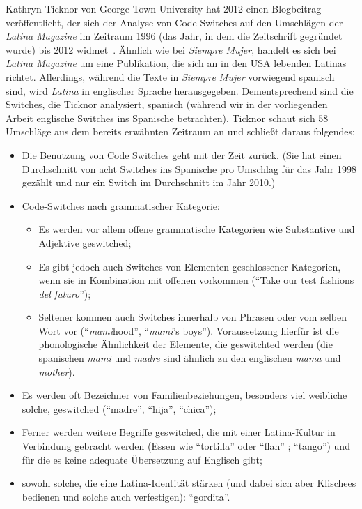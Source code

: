 Kathryn Ticknor von George Town University hat 2012 einen Blogbeitrag veröffentlicht, der sich der Analyse von Code-Switches auf den Umschlägen der \textit{Latina Magazine} im Zeitraum 1996 (das Jahr, in dem die Zeitschrift gegründet wurde) bis 2012 widmet~\cite[]{Ticknor12}.
Ähnlich wie bei \textit{Siempre Mujer}, handelt es sich bei \textit{Latina Magazine} um eine Publikation, die sich an in den USA lebenden Latinas richtet.
Allerdings, während die Texte in \textit{Siempre Mujer} vorwiegend spanisch sind, wird \textit{Latina} in englischer Sprache herausgegeben.
Dementsprechend sind die Switches, die Ticknor analysiert, spanisch (während wir in der vorliegenden Arbeit englische Switches ins Spanische betrachten).
Ticknor schaut sich 58 Umschläge aus dem bereits erwähnten Zeitraum an und schließt daraus folgendes:
\begin{itemize}
  \item Die Benutzung von Code Switches geht mit der Zeit zurück. (Sie hat einen Durchschnitt von acht Switches ins Spanische pro Umschlag für das Jahr 1998 gezählt und nur ein Switch im Durchschnitt im Jahr 2010.)
  \item Code-Switches nach grammatischer Kategorie:
    \begin{itemize}
      \item Es werden vor allem offene grammatische Kategorien wie Substantive und Adjektive geswitched;
      \item Es gibt jedoch auch Switches von Elementen geschlossener Kategorien, wenn sie in Kombination mit offenen vorkommen (``Take our test fashions \textit{del futuro}'');
      \item Seltener kommen auch Switches innerhalb von Phrasen oder vom selben Wort vor (``\textit{mami}hood'', ``\textit{mami}'s boys''). Voraussetzung hierfür ist die phonologische Ähnlichkeit der Elemente, die geswitchted werden (die spanischen \textit{mami} und \textit{madre} sind ähnlich zu den englischen \textit{mama} und \textit{mother}).
    \end{itemize}
  \item Es werden oft Bezeichner von Familienbeziehungen, besonders viel weibliche solche, geswitched (``madre'', ``hija'', ``chica'');
  \item Ferner werden weitere Begriffe geswitched, die mit einer Latina-Kultur in Verbindung gebracht werden (Essen wie ``tortilla'' oder ``flan'' ; ``tango'') und für die es keine adequate Übersetzung auf Englisch gibt;
  \item sowohl solche, die eine Latina-Identität stärken (und dabei sich aber Klischees bedienen und solche auch verfestigen): ``gordita''.
\end{itemize}

